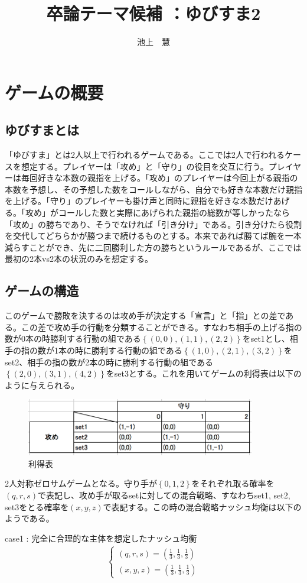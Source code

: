\documentclass{jsarticle}
\begin{document}
\title{卒論テーマ候補 ：ゆびすま2}
\author{池上　慧}
\maketitle

\section{ゲームの概要}
\subsection{ゆびすまとは}
「ゆびすま」とは2人以上で行われるゲームである。ここでは2人で行われるケースを想定する。プレイヤーは「攻め」と「守り」の役目を交互に行う。プレイヤーは毎回好きな本数の親指を上げる。「攻め」のプレイヤーは今回上がる親指の本数を予想し、その予想した数をコールしながら、自分でも好きな本数だけ親指を上げる。「守り」のプレイヤーも掛け声と同時に親指を好きな本数だけあげる。「攻め」がコールした数と実際にあげられた親指の総数が等しかったなら「攻め」の勝ちであり、そうでなければ「引き分け」である。引き分けたら役割を交代してどちらかが勝つまで続けるものとする。本来であれば勝てば腕を一本減らすことができ、先に二回勝利した方の勝ちというルールであるが、ここでは最初の2本vs2本の状況のみを想定する。

\subsection{ゲームの構造}
このゲームで勝敗を決するのは攻め手が決定する「宣言」と「指」との差である。この差で攻め手の行動を分類することができる。すなわち相手の上げる指の数が0本の時勝利する行動の組である$\left\{ (0,0), (1,1), (2,2)\right\}$をset1とし、相手の指の数が1本の時に勝利する行動の組である$\left\{ (1,0), (2,1), (3,2)\right\}$をset2、相手の指の数が2本の時に勝利する行動の組である$\left\{ (2,0), (3,1), (4,2)\right\}$をset3とする。これを用いてゲームの利得表は以下のように与えられる。
\begin{figure}[h]
    \centering
    \includegraphics[width=10cm]{pmat.png}
    \caption{利得表}
\end{figure}
2人対称ゼロサムゲームとなる。守り手が$\left\{ 0,1,2\right\}$をそれぞれ取る確率を$(q,r,s)$で表記し、攻め手が取るsetに対しての混合戦略、すなわちset1, set2, set3をとる確率を$(x,y,z)$で表記する。この時の混合戦略ナッシュ均衡は以下のようである。
\begin{itembox}[l]{case1 : 完全に合理的な主体を想定したナッシュ均衡}
    \begin{align}
    	\begin{cases}
		(q, r, s) = (\frac{1}{3}, \frac{1}{3}, \frac{1}{3})\\
		(x, y, z) = (\frac{1}{3}, \frac{1}{3}, \frac{1}{3})
	\end{cases}
    \end{align}
\end{itembox}
\end{document}
